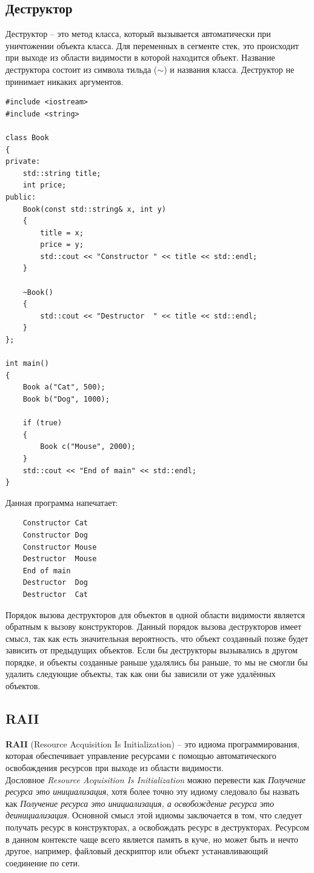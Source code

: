 \documentclass{article}
\begin{document}
\subsection*{Деструктор}
Деструктор -- это метод класса, который вызывается автоматически при уничтожении объекта класса. Для переменных в сегменте стек, это происходит при выходе из области видимости в которой находится объект. Название деструктора состоит из символа тильда ($\sim$) и названия класса. Деструктор не принимает никаких аргументов.
\begin{lstlisting}
#include <iostream>
#include <string>

class Book 
{
private:
    std::string title;
    int price;
public:
    Book(const std::string& x, int y)
    {
        title = x;
        price = y;
        std::cout << "Constructor " << title << std::endl;
    }
    
    ~Book()
    {
        std::cout << "Destructor  " << title << std::endl;
    }
};

int main() 
{
    Book a("Cat", 500);
    Book b("Dog", 1000);
    
    if (true)
    {
        Book c("Mouse", 2000);
    }
    std::cout << "End of main" << std::endl;
}
\end{lstlisting}
Данная программа напечатает:
\begin{verbatim}
    Constructor Cat
    Constructor Dog
    Constructor Mouse
    Destructor  Mouse
    End of main
    Destructor  Dog
    Destructor  Cat
\end{verbatim}
Порядок вызова деструкторов для объектов в одной области видимости является обратным к вызову конструкторов. Данный порядок вызова деструкторов имеет смысл, так как есть значительная вероятность, что объект созданный позже будет зависить от предыдущих объектов. Если бы деструкторы вызывались в другом порядке, и объекты созданные раньше удалялись бы раньше, то мы не смогли бы удалить следующие объекты, так как они бы зависили от уже удалённых объектов.

\newpage
\subsection*{RAII}
\noindent \textbf{RAII} (Resource Acquisition Is Initialization) -- это идиома программирования, которая обеспечивает управление ресурсами с помощью автоматического освобождения ресурсов при выходе из области видимости.\\

Дословное \textit{Resource Acquisition Is Initialization} можно перевести как \textit{Получение ресурса это инициализация}, хотя более точно эту идиому следовало бы назвать как \textit{Получение ресурса это инициализация, а освобождение ресурса это деинициализация}. Основной смысл этой идиомы заключается в том, что следует получать ресурс в конструкторах, а освобождать ресурс в деструкторах. Ресурсом в данном контексте чаще всего является память в куче, но может быть и нечто другое, например, файловый дескриптор или объект устанавливающий соединение по сети.
\end{document}
